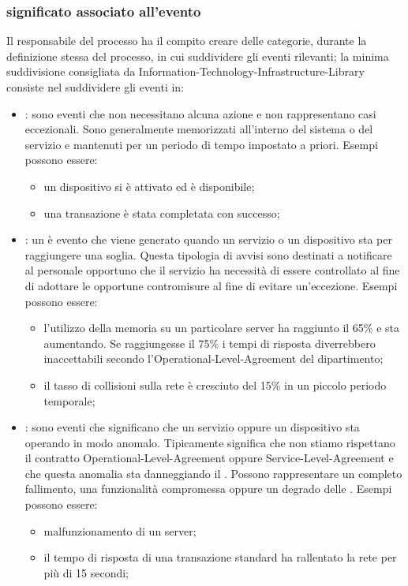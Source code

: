 \subsubsection[Significato associato all'evento]{significato associato all'evento}
Il responsabile del processo ha il compito creare delle categorie, durante la definizione stessa del processo, in cui suddividere gli eventi rilevanti; la minima suddivisione consigliata da \ac{Information-Technology-Infrastructure-Library} consiste nel suddividere gli eventi in:

\begin{itemize}
\item{: sono eventi che non necessitano alcuna azione e non rappresentano casi eccezionali. Sono generalmente memorizzati all'interno del sistema o del servizio e mantenuti per un periodo di tempo impostato a priori. Esempi possono essere:}
\begin{itemize}
\item{un dispositivo si è attivato ed è disponibile;}
\item{una transazione è stata completata con successo;}
\end{itemize}
\item{: un  è evento che viene generato quando un servizio o un dispositivo sta per raggiungere una soglia. Questa tipologia di avvisi sono destinati a notificare al personale opportuno che il servizio ha necessità di essere controllato al fine di adottare le opportune contromisure al fine di evitare un'eccezione. Esempi possono essere:}
\begin{itemize}
\item{l'utilizzo della memoria su un particolare server ha raggiunto il 65\% e sta aumentando. Se raggiungesse il 75\% i tempi di risposta diverrebbero inaccettabili secondo l'\ac{Operational-Level-Agreement} del dipartimento;}
\item{il tasso di collisioni sulla rete è cresciuto del 15\% in un piccolo periodo temporale;}
\end{itemize}
\item{: sono eventi che significano che un servizio oppure un dispositivo sta operando in modo anomalo. Tipicamente significa che non stiamo rispettano il contratto \ac{Operational-Level-Agreement} oppure \ac{Service-Level-Agreement} e che questa anomalia sta danneggiando il . Possono rappresentare un completo fallimento, una funzionalità compromessa oppure un degrado delle . Esempi possono essere:}
\begin{itemize}
\item{malfunzionamento di un server;}
\item{il tempo di risposta di una transazione standard ha rallentato la rete per più di 15 secondi;}
\end{itemize}
\end{itemize}

